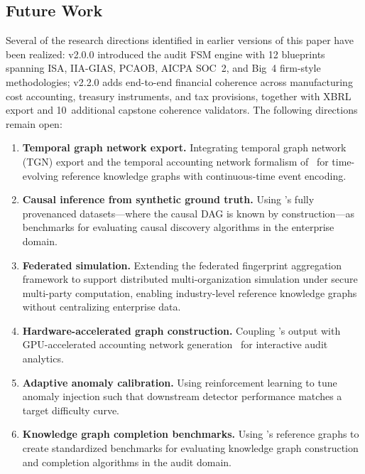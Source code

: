 \subsection{Future Work}
\label{sec:future_work}

Several of the research directions identified in earlier versions of
this paper have been realized: v2.0.0 introduced the audit FSM engine
with 12 blueprints spanning ISA, IIA-GIAS, PCAOB, AICPA SOC~2,
and Big~4 firm-style methodologies; v2.2.0 adds end-to-end financial
coherence across manufacturing cost accounting, treasury instruments,
and tax provisions, together with XBRL export and 10~additional
capstone coherence validators.  The following directions remain open:

\begin{enumerate}
  \item \textbf{Temporal graph network export.}  Integrating temporal
    graph network (TGN) export and the temporal accounting network
    formalism of~\citet{ivertowski2024temporal} for time-evolving
    reference knowledge graphs with continuous-time event encoding.

  \item \textbf{Causal inference from synthetic ground truth.}  Using
    \system{}'s fully provenanced datasets---where the causal DAG is
    known by construction---as benchmarks for evaluating causal
    discovery algorithms in the enterprise domain.

  \item \textbf{Federated simulation.}  Extending the federated
    fingerprint aggregation framework to support distributed
    multi-organization simulation under secure multi-party computation,
    enabling industry-level reference knowledge graphs without
    centralizing enterprise data.

  \item \textbf{Hardware-accelerated graph construction.}  Coupling
    \system{}'s output with GPU-accelerated accounting network
    generation~\citep{ivertowski2024hardware} for interactive audit
    analytics.

  \item \textbf{Adaptive anomaly calibration.}  Using reinforcement
    learning to tune anomaly injection such that downstream detector
    performance matches a target difficulty curve.

  \item \textbf{Knowledge graph completion benchmarks.}  Using
    \system{}'s reference graphs to create standardized benchmarks for
    evaluating knowledge graph construction and completion algorithms
    in the audit domain.


\end{enumerate}
